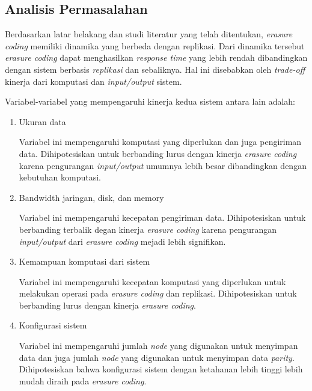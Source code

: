 \subsection{Analisis Permasalahan}
\label{subsection:analisis-permasalahan}


Berdasarkan latar belakang dan studi literatur yang telah ditentukan, \textit{erasure coding} memiliki dinamika yang berbeda dengan replikasi. Dari dinamika tersebut \textit{erasure coding} dapat menghasilkan \textit{response time} yang lebih rendah dibandingkan dengan sistem berbasis \textit{replikasi} dan sebaliknya. Hal ini disebabkan oleh \textit{trade-off} kinerja dari komputasi dan \textit{input/output} sistem.

Variabel-variabel yang mempengaruhi kinerja kedua sistem antara lain adalah:
\begin{enumerate}
    \item Ukuran data
    
    Variabel ini mempengaruhi komputasi yang diperlukan dan juga pengiriman data. Dihipotesiskan untuk berbanding lurus dengan kinerja \textit{erasure coding} karena pengurangan \textit{input/output} umumnya lebih besar dibandingkan dengan kebutuhan komputasi.

    \item Bandwidth jaringan, disk, dan memory
    
    Variabel ini mempengaruhi kecepatan pengiriman data. Dihipotesiskan untuk berbanding terbalik degan kinerja \textit{erasure coding} karena pengurangan \textit{input/output} dari \textit{erasure coding} mejadi lebih signifikan.

    \item Kemampuan komputasi dari sistem
    
    Variabel ini mempengaruhi kecepatan komputasi yang diperlukan untuk melakukan operasi pada \textit{erasure coding} dan replikasi. Dihipotesiskan untuk berbanding lurus dengan kinerja \textit{erasure coding}.
    
    \item Konfigurasi sistem
    
    Variabel ini mempengaruhi jumlah \textit{node} yang digunakan untuk menyimpan data dan juga jumlah \textit{node} yang digunakan untuk menyimpan data \textit{parity}. Dihipotesiskan bahwa konfigurasi sistem dengan ketahanan lebih tinggi lebih mudah diraih pada \textit{erasure coding}.

\end{enumerate}

